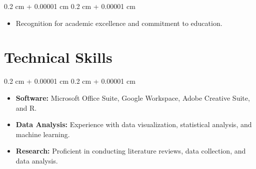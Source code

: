 \documentclass[10pt, letterpaper]{article}
\newenvironment{highlights}{
    \begin{itemize}[
        topsep=0.10 cm,
        parsep=0.10 cm,
        partopsep=0pt,
        itemsep=0pt,
        leftmargin=0.4 cm + 10pt
    ]
}{
    \end{itemize}
} %
\newenvironment{onecolentry}{
    \begin{adjustwidth}{
        0.2 cm + 0.00001 cm
    }{
        0.2 cm + 0.00001 cm
    }
}{
    \end{adjustwidth}
} %
\newenvironment{twocolentry}[2][]{
    \onecolentry
    \def\secondColumn{#2}
    \setcolumnwidth{\fill, 4.5 cm}
    \begin{paracol}{2}
}{
    \switchcolumn \raggedleft \secondColumn
    \end{paracol}
    \endonecolentry
} %
\begin{document}
\begin{onecolentry}
\begin{highlights}
    \item Recognition for academic excellence and commitment to education.
\end{highlights}
\end{onecolentry}


\begin{tiny}
    \textcolor{white}{}
\end{tiny}


\section{Technical Skills}

\begin{onecolentry}
    \begin{highlights}
        \item \textbf{Software:} Microsoft Office Suite, Google Workspace, Adobe Creative Suite, and R.
        \item \textbf{Data Analysis:} Experience with data visualization, statistical analysis, and machine learning.
        \item \textbf{Research:} Proficient in conducting literature reviews, data collection, and data analysis.
    \end{highlights}
\end{onecolentry}




\end{document}
